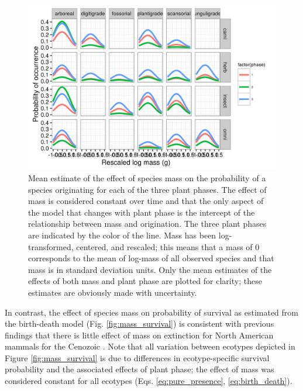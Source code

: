 \documentclass[12pt,letterpaper]{article}
\begin{document}
\begin{figure}[ht]
  \centering
  \includegraphics[width=\textwidth,height=0.4\textheight,keepaspectratio=true]{figure/mass_on_origin_bd}
  \caption[Effect of mass on probability of species origination as estimated from the birth-death model]{Mean estimate of the effect of species mass on the probability of a species originating for each of the three plant phases. The effect of mass is considered constant over time and that the only aspect of the model that changes with plant phase is the intercept of the relationship between mass and origination. The three plant phases are indicated by the color of the line. Mass has been log-transformed, centered, and rescaled; this means that a mass of 0 corresponds to the mean of log-mass of all observed species and that mass is in standard deviation units. Only the mean estimates of the effects of both mass and plant phase are plotted for clarity; these estimates are obviously made with uncertainty.}
  \label{fig:mass_origin}
\end{figure}



In contrast, the effect of species mass on probability of survival as estimated from the birth-death model (Fig. \ref{fig:mass_survival}) is consistent with previous findings that there is little effect of mass on extinction for North American mammals for the Cenozoic \citep{Smits2015b,Tomiya2013}. Note that all variation between ecotypes depicted in Figure \ref{fig:mass_survival} is due to differences in ecotype-specific survival probability and the associated effects of plant phase; the effect of mass was considered constant for all ecotypes (Eqs. \ref{eq:pure_presence}, \ref{eq:birth_death}).
\end{document}
